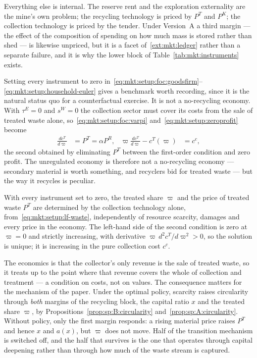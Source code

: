 Everything else is internal. The reserve rent and the exploration externality are the mine's own
problem; the recycling technology is priced by $P^T$ and $P^K$; the collection technology is priced by
the tender. Under Version~A a third margin --- the effect of the composition of spending on how much
mass is stored rather than shed --- is likewise unpriced, but it is a facet of~\ref{ext:mkt:ledger}
rather than a separate failure, and it is why the lower block of Table~\ref{tab:mkt:instruments}
exists.

 Setting every instrument to zero
in~\eqref{eq:mkt:setup:foc:goodsfirm}--\eqref{eq:mkt:setup:household-euler} gives a benchmark worth
recording, since it is the natural status quo for a counterfactual exercise. It is not a no-recycling
economy. With $\tau^E=0$ and $s^W=0$ the collection sector must cover its costs from the sale of
treated waste alone, so~\eqref{eq:mkt:setup:foc:varpi} and~\eqref{eq:mkt:setup:zeroprofit} become
\begin{align}
\frac{dc^T}{d\varpi} &= P^T=\alpha P^R,
&
\varpi\frac{dc^T}{d\varpi}-c^T\!\left(\varpi\right) &= c^c,
\label{eq:mkt:setup:lf-waste}
\end{align}
the second obtained by eliminating $P^T$ between the first-order condition and zero profit. The
unregulated economy is therefore not a no-recycling economy --- secondary material is worth something,
and recyclers bid for treated waste --- but the way it recycles is peculiar.

\begin{proposition}
\label{prop:mkt:lf-varpi}
With every instrument set to zero, the treated share $\varpi$ and the price of treated waste $P^T$ are
determined by the collection technology alone, from~\eqref{eq:mkt:setup:lf-waste}, independently of
resource scarcity, damages and every price in the economy. The left-hand side of the second condition
is zero at $\varpi=0$ and strictly increasing, with derivative $\varpi\,d^2c^T/d\varpi^2>0$, so the
solution is unique; it is increasing in the pure collection cost $c^c$.
\end{proposition}

The economics is that the collector's only revenue is the sale of treated waste, so it treats up to the
point where that revenue covers the whole of collection and treatment --- a condition on costs, not on
values. The consequence matters for the mechanism of the paper. Under the optimal policy, scarcity
raises circularity through \emph{both} margins of the recycling block, the capital ratio $x$ and the
treated share $\varpi$, by Propositions~\ref{prop:sp:B:circularity}
and~\ref{prop:sp:A:circularity}. Without policy, only the first margin responds: a rising material
price raises $P^T$ and hence $x$ and $a(x)$, but $\varpi$ does not move. Half of the transition
mechanism is switched off, and the half that survives is the one that operates through capital
deepening rather than through how much of the waste stream is captured.

